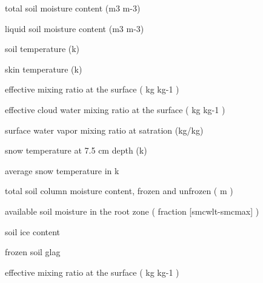   total soil moisture content (m3 m-3)

  liquid soil moisture content (m3 m-3)

  soil temperature (k)

  skin temperature (k)

  effective mixing ratio
 at the surface ( kg kg{-1} )

  effective cloud water mixing ratio
 at the surface ( kg kg{-1} )

  surface water vapor mixing ratio
 at satration (kg/kg)

  snow temperature at 7.5 cm depth (k)

  average snow temperature in k

  total soil column moisture content, frozen
 and unfrozen ( m )

  available soil moisture in the root zone
 ( fraction [smcwlt-smcmax] )

  soil ice content 

  frozen soil glag

  effective mixing ratio at the surface ( kg kg{-1} )
 

